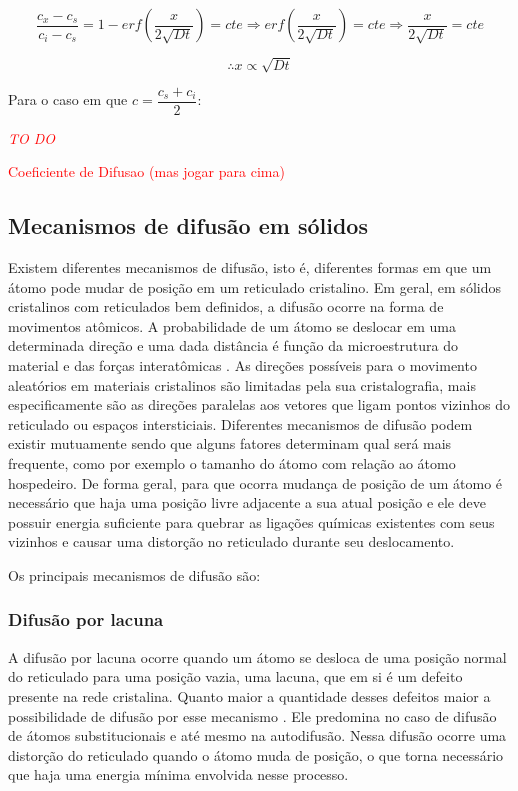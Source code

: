 \documentclass[]{politex}
\newcommand\myworries[1]{\textcolor{red}{#1}}
\begin{document}
$$\frac{c_x - c_s}{c_i - c_s} = 1 - erf(\frac{x}{2\sqrt{Dt}}) = cte \Rightarrow erf(\frac{x}{2\sqrt{Dt}}) = cte \Rightarrow \frac{x}{2\sqrt{Dt}} = cte$$

\begin{equation} \label{eq:difdist}
		\therefore x \propto  \sqrt{Dt}
\end{equation}

Para o caso em que $c = \dfrac{c_s + c_i}{2}$: \par
\myworries{\textit{TO DO}} \par
\myworries{Coeficiente de Difusao (mas jogar para cima)}


\subsection{Mecanismos de difusão em sólidos}
	Existem diferentes mecanismos de difusão, isto é, diferentes formas em que um átomo pode mudar de posição em um reticulado cristalino. Em geral, em sólidos cristalinos com reticulados bem definidos, a difusão ocorre na forma de movimentos atômicos. A probabilidade de um átomo se deslocar em uma determinada direção e uma dada distância é função da microestrutura do material e das forças interatômicas \cite{glicksman2000diffusion}.
	As direções possíveis para o movimento aleatórios em materiais cristalinos são limitadas pela sua cristalografia, mais especificamente são as direções paralelas aos vetores que ligam pontos vizinhos do reticulado ou espaços intersticiais.
	Diferentes mecanismos de difusão podem existir mutuamente sendo que alguns fatores determinam qual será mais frequente, como por exemplo o tamanho do átomo com relação ao átomo hospedeiro. De forma geral, para que ocorra mudança de posição de um átomo é necessário que haja uma posição livre adjacente a sua atual posição e ele deve possuir energia suficiente para quebrar as ligações químicas existentes com seus vizinhos e causar uma distorção no reticulado durante seu deslocamento. \par
	Os principais mecanismos de difusão são:
\subsubsection{Difusão por lacuna}
A difusão por lacuna ocorre quando um átomo se desloca de uma posição normal do reticulado para uma posição vazia, uma lacuna, que em si é um defeito presente na rede cristalina. Quanto maior a quantidade desses defeitos maior a possibilidade de difusão por esse mecanismo \cite{callister2007materials}. Ele predomina no caso de difusão de átomos substitucionais e até mesmo na autodifusão. Nessa difusão ocorre uma distorção do reticulado quando o átomo muda de posição, o que torna necessário que haja uma energia mínima envolvida nesse processo.
\end{document}
